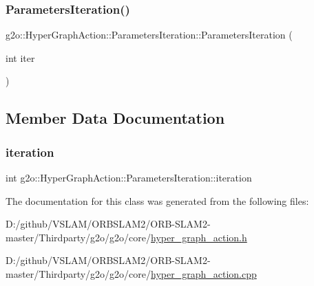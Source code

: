 \subsubsection{\texorpdfstring{Parameters\+Iteration()}{ParametersIteration()}}
{\footnotesize\ttfamily g2o\+::\+Hyper\+Graph\+Action\+::\+Parameters\+Iteration\+::\+Parameters\+Iteration (\begin{DoxyParamCaption}\item[{int}]{iter }\end{DoxyParamCaption})\hspace{0.3cm}{\ttfamily [explicit]}}



\subsection{Member Data Documentation}
\mbox{\label{classg2o_1_1_hyper_graph_action_1_1_parameters_iteration_a6ec1e8c9333e75e9531bebe055e23ce2}} 
\subsubsection{\texorpdfstring{iteration}{iteration}}
{\footnotesize\ttfamily int g2o\+::\+Hyper\+Graph\+Action\+::\+Parameters\+Iteration\+::iteration}



The documentation for this class was generated from the following files\+:\begin{DoxyCompactItemize}
\item 
D\+:/github/\+V\+S\+L\+A\+M/\+O\+R\+B\+S\+L\+A\+M2/\+O\+R\+B-\/\+S\+L\+A\+M2-\/master/\+Thirdparty/g2o/g2o/core/\mbox{\hyperlink{hyper__graph__action_8h}{hyper\+\_\+graph\+\_\+action.\+h}}\item 
D\+:/github/\+V\+S\+L\+A\+M/\+O\+R\+B\+S\+L\+A\+M2/\+O\+R\+B-\/\+S\+L\+A\+M2-\/master/\+Thirdparty/g2o/g2o/core/\mbox{\hyperlink{hyper__graph__action_8cpp}{hyper\+\_\+graph\+\_\+action.\+cpp}}\end{DoxyCompactItemize}
